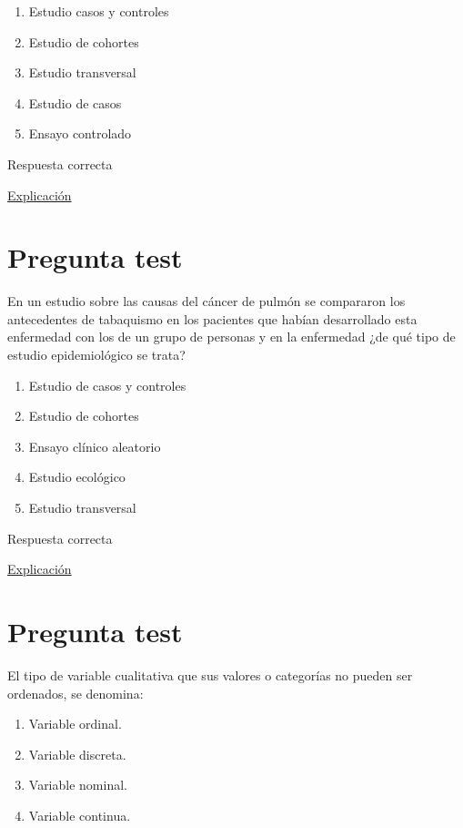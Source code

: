 \documentclass[
]{book}
\providecommand{\tightlist}{%
  \setlength{\itemsep}{0pt}\setlength{\parskip}{0pt}}
\begin{document}
\begin{enumerate}
\def\labelenumi{\alph{enumi})}
\tightlist
\item
  Estudio casos y controles
\item
  Estudio de cohortes
\item
  Estudio transversal
\item
  Estudio de casos
\item
  Ensayo controlado
\end{enumerate}

Respuesta correcta

\href{https://es.wikipedia.org/wiki/Estudio_de_cohorte}{Explicación}

\hypertarget{pregunta-test-33}{%
\section{Pregunta test}\label{pregunta-test-33}}

En un estudio sobre las causas del cáncer de pulmón se compararon los antecedentes de tabaquismo en los pacientes que habían desarrollado esta enfermedad con los de un grupo de personas y en la enfermedad ¿de qué tipo de estudio epidemiológico se trata?

\begin{enumerate}
\def\labelenumi{\alph{enumi})}
\tightlist
\item
  Estudio de casos y controles
\item
  Estudio de cohortes
\item
  Ensayo clínico aleatorio
\item
  Estudio ecológico
\item
  Estudio transversal
\end{enumerate}

Respuesta correcta

\href{http://www.scielo.org.pe/scielo.php?script=sci_arttext\&pid=S2308-05312020000100138}{Explicación}

\hypertarget{pregunta-test-34}{%
\section{Pregunta test}\label{pregunta-test-34}}

El tipo de variable cualitativa que sus valores o categorías no pueden ser ordenados, se denomina:

\begin{enumerate}
\def\labelenumi{\alph{enumi})}
\tightlist
\item
  Variable ordinal.
\item
  Variable discreta.
\item
  Variable nominal.
\item
  Variable continua.
\end{enumerate}
\end{document}
